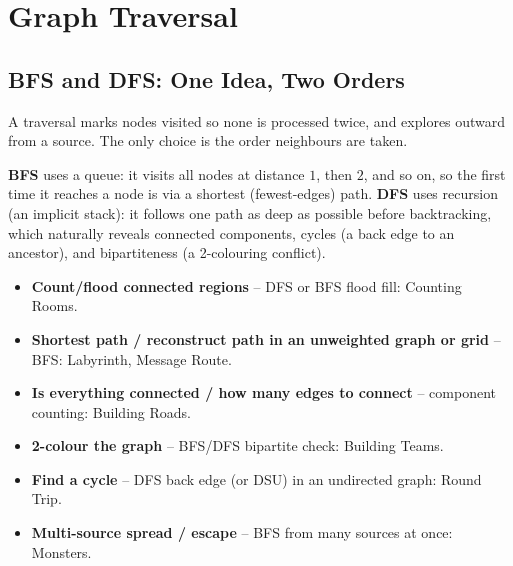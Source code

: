 \chapter{Graph Traversal}

\section{BFS and DFS: One Idea, Two Orders}
\label{sec:cses-graph-traversal-intro}

A traversal marks nodes visited so none is processed twice, and explores
outward from a source. The only choice is the order neighbours are taken.

\begin{ideabox}
\textbf{BFS} uses a queue: it visits all nodes at distance $1$, then $2$,
and so on, so the first time it reaches a node is via a shortest
(fewest-edges) path. \textbf{DFS} uses recursion (an implicit stack): it
follows one path as deep as possible before backtracking, which naturally
reveals connected components, cycles (a back edge to an ancestor), and
bipartiteness (a 2-colouring conflict).
\end{ideabox}

\begin{patternbox}
\begin{itemize}
  \item \textbf{Count/flood connected regions} -- DFS or BFS flood fill:
        Counting Rooms.
  \item \textbf{Shortest path / reconstruct path in an unweighted graph
        or grid} -- BFS: Labyrinth, Message Route.
  \item \textbf{Is everything connected / how many edges to connect} --
        component counting: Building Roads.
  \item \textbf{2-colour the graph} -- BFS/DFS bipartite check: Building
        Teams.
  \item \textbf{Find a cycle} -- DFS back edge (or DSU) in an undirected
        graph: Round Trip.
  \item \textbf{Multi-source spread / escape} -- BFS from many sources at
        once: Monsters.
\end{itemize}
\end{patternbox}

